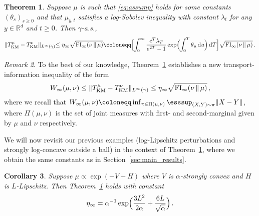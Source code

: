 \documentclass[12pt]{article}
\newcommand{\RR}{\mathbb{R}}
\newcommand{\R}{\RR}
\newcommand{\1}{\mathds{1}}
\newcommand*{\defeq}{\coloneqq}
\newcommand*{\rd}{\mathrm{d}}
\newcommand*{\dd}{\, \rd}
\newcommand{\mmid}{\,\Vert\,}
\def\defeq{\coloneqq} %
\newcommand{\infFI}{\operatorname{FI}_\infty}
\theoremstyle{plain}
\newtheorem{theorem}{Theorem}[section]
\newtheorem{corollary}[theorem]{Corollary}
\theoremstyle{definition}
\theoremstyle{remark}
\newtheorem{remark}[theorem]{Remark}
\begin{document}
\begin{theorem}\label{thm:inffi}
    Suppose $\mu$ is such that \eqref{eq:assump} holds for some constants $(\theta_s)_{s \geq 0}$ and that $\mu_{y,t}$ satisfies a log-Sobolev inequality with constant ${\lambda_t}$ for any $y \in \R^d$ and $t \geq 0$. Then $\gamma$-a.s.,
    \begin{align*}
        \|T^\mu_{\rm KM} - T^\nu_{\rm KM}\|_{L^\infty(\gamma)} {\leq \eta_\infty\sqrt{\infFI(\nu\mmid\mu)} \defeq \Bigl[\int_0^\infty \frac{e^T \lambda_T}{e^{2T}-1} \exp\Bigl(\int_0^T \theta_u\dd u\Bigr)\dd T\Bigr]} \sqrt{\infFI(\nu\mmid\mu)}\,.
    \end{align*}
\end{theorem}
{
\begin{remark}
To the best of our knowledge, Theorem~\ref{thm:inffi} establishes a new transport-information inequality of the form 
\begin{align*}
    W_\infty(\mu,\nu) \leq \|T^\mu_{\rm KM} - T_{\rm KM}^\nu\|_{L^\infty(\gamma)}  \leq \eta_\infty\sqrt{\infFI(\nu\mmid\mu)}\,,
\end{align*}
where we recall that $W_\infty(\mu,\nu) \defeq \inf_{\pi \in \Pi(\mu,\nu)} \esssup_{(X,Y)\sim\pi} \|X-Y\|$,  
where $\Pi(\mu,\nu)$ is the set of joint measures with first- and second-marginal given by $\mu$ and $\nu$ respectively.    
\end{remark}
We will now revisit our previous examples (log-Lipschitz perturbations and strongly log-concave outside a ball) in the context of Theorem~\ref{thm:inffi}, where we obtain the same constants as in Section~\ref{sec:main_results}.
}
\begin{corollary}\label{cor:pert_inf}
Suppose $\mu\propto\exp(-{V +H})$ where $V$ is $\alpha$-strongly convex and $H$ is $L$-Lipschitz. Then Theorem~\ref{thm:inffi} holds with constant
\begin{align*}
    \eta_\infty = \alpha^{-1}\exp\Bigl(\frac{3L^2}{2\alpha} + \frac{6L}{\sqrt{\alpha}}\Bigr)\,.
\end{align*}
\end{corollary}
\end{document}

